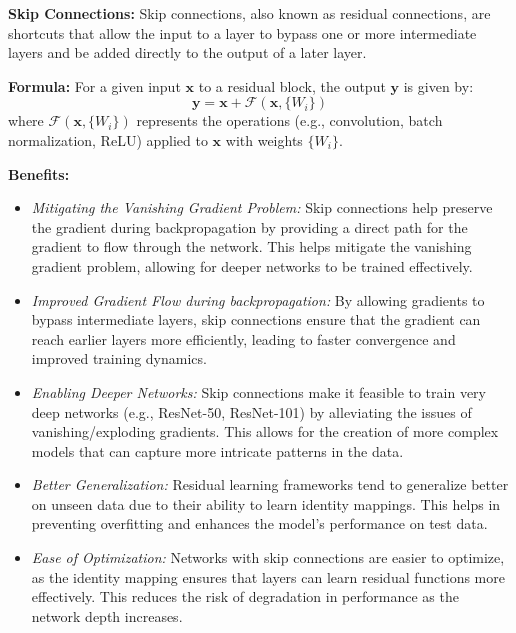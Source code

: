 \documentclass[12pt]{article}
\begin{document}
\textbf{Skip Connections:}
Skip connections, also known as residual connections, are shortcuts that allow the input to a layer to bypass one or more intermediate layers and be added directly to the output of a later layer.

\textbf{Formula:}
For a given input \( \mathbf{x} \) to a residual block, the output \( \mathbf{y} \) is given by:
\[
\mathbf{y} = \mathbf{x} + \mathcal{F}(\mathbf{x}, \{W_i\})
\]
where \( \mathcal{F}(\mathbf{x}, \{W_i\}) \) represents the operations (e.g., convolution, batch normalization, ReLU) applied to \( \mathbf{x} \) with weights \( \{W_i\} \).

\textbf{Benefits:}

\begin{itemize}
    \item \textit{Mitigating the Vanishing Gradient Problem:}
    Skip connections help preserve the gradient during backpropagation by providing a direct path for the gradient to flow through the network. This helps mitigate the vanishing gradient problem, allowing for deeper networks to be trained effectively.

    \item \textit{Improved Gradient Flow during backpropagation:}
    By allowing gradients to bypass intermediate layers, skip connections ensure that the gradient can reach earlier layers more efficiently, leading to faster convergence and improved training dynamics.

    \item \textit{Enabling Deeper Networks:}
    Skip connections make it feasible to train very deep networks (e.g., ResNet-50, ResNet-101) by alleviating the issues of vanishing/exploding gradients. This allows for the creation of more complex models that can capture more intricate patterns in the data.

    \item \textit{Better Generalization:}
    Residual learning frameworks tend to generalize better on unseen data due to their ability to learn identity mappings. This helps in preventing overfitting and enhances the model's performance on test data.

    \item \textit{Ease of Optimization:}
    Networks with skip connections are easier to optimize, as the identity mapping ensures that layers can learn residual functions more effectively. This reduces the risk of degradation in performance as the network depth increases.

\end{itemize}
\end{document}
